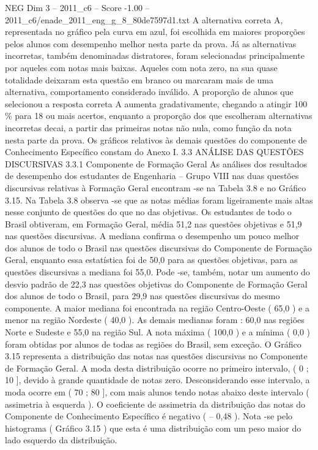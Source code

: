 \begin{textsample}{NEG Dim 3 – 2011\_c6 – Score -1.00 – 2011\_c6/enade\_2011\_eng\_g\_8\_80de7597d1.txt}
A alternativa correta A, representada no gráfico pela curva em azul, foi escolhida em maiores proporções pelos alunos com desempenho melhor nesta parte da prova.
Já as alternativas incorretas, também denominadas distratores, foram selecionadas principalmente por aqueles com notas mais baixas.
Aqueles com nota zero, na sua quase totalidade deixaram esta questão em branco ou marcaram mais de uma alternativa, comportamento considerado inválido.
A proporção de alunos que selecionou a resposta correta A aumenta gradativamente, chegando a atingir 100 \% para 18 ou mais acertos, enquanto a proporção dos que escolheram alternativas incorretas decai, a partir das primeiras notas não nula, como função da nota nesta parte da prova.
Os gráficos relativos às demais questões do componente de Conhecimento Específico constam do Anexo I. 3.3 ANÁLISE DAS QUESTÕES DISCURSIVAS 3.3.1 Componente de Formação Geral As análises dos resultados de desempenho dos estudantes de Engenharia – Grupo VIII nas duas questões discursivas relativas à Formação Geral encontram -se na Tabela 3.8 e no Gráfico 3.15.
Na Tabela 3.8 observa -se que as notas médias foram ligeiramente mais altas nesse conjunto de questões do que no das objetivas.
Os estudantes de todo o Brasil obtiveram, em Formação Geral, média 51,2 nas questões objetivas e 51,9 nas questões discursivas.
A mediana confirma o desempenho um pouco melhor dos alunos de todo o Brasil nas questões discursivas do Componente de Formação Geral, enquanto essa estatística foi de 50,0 para as questões objetivas, para as questões discursivas a mediana foi 55,0.
Pode -se, também, notar um aumento do desvio padrão de 22,3 nas questões objetivas do Componente de Formação Geral dos alunos de todo o Brasil, para 29,9 nas questões discursivas do mesmo componente.
A maior mediana foi encontrada na região Centro-Oeste ( 65,0 ) e a menor na região Nordeste ( 40,0 ).
As demais medianas foram : 60,0 nas regiões Norte e Sudeste e 55,0 na região Sul.
A nota máxima ( 100,0 ) e a mínima ( 0,0 ) foram obtidas por alunos de todas as regiões do Brasil, sem exceção.
O Gráfico 3.15 representa a distribuição das notas nas questões discursivas no Componente de Formação Geral.
A moda desta distribuição ocorre no primeiro intervalo, ( 0 ; 10 ], devido à grande quantidade de notas zero.
Desconsiderando esse intervalo, a moda ocorre em ( 70 ; 80 ], com mais alunos tendo notas abaixo deste intervalo ( assimetria à esquerda ).
O coeficiente de assimetria da distribuição das notas do Componente de Conhecimento Específico é negativo ( – 0,48 ).
Nota -se pelo histograma ( Gráfico 3.15 ) que esta é uma distribuição com um peso maior do lado esquerdo da distribuição.

\end{textsample}
